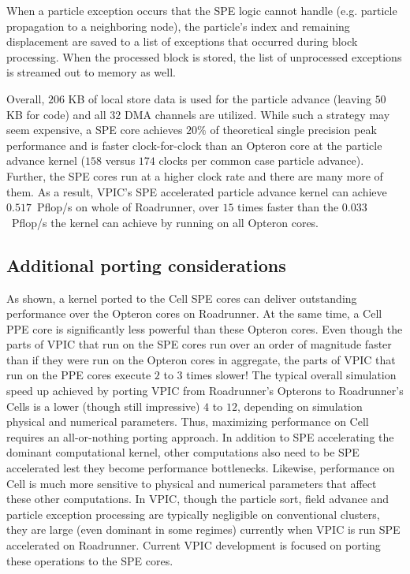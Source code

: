 \documentclass[letter,10pt]{article}
\begin{document}
When a particle exception occurs that the SPE logic cannot handle
(e.g. particle propagation to a neighboring node), the
particle's index and remaining displacement are saved to a list of
exceptions that occurred during block processing.  When the processed
block is stored, the list of unprocessed exceptions
is streamed out to memory as well.


Overall, $206$ KB of local store data is used for the particle advance
(leaving $50$ KB for code) and all $32$ DMA channels are utilized.
While such a strategy may seem expensive, a SPE core achieves $20\%$
of theoretical single precision peak performance and is faster
clock-for-clock than an Opteron core at the particle advance kernel
($158$ versus $174$ clocks per common case particle advance).  Further, 
the SPE cores run at a higher clock rate and there are many more of
them.  As a result, VPIC's SPE accelerated particle advance kernel can
achieve $0.517$~Pflop/s on whole of Roadrunner, over $15$ times faster
than the $0.033$~Pflop/s the kernel can achieve by running on all
Opteron cores.

\subsection{Additional porting considerations}

As shown, a kernel ported to the Cell SPE cores can deliver
outstanding performance over the Opteron cores on Roadrunner.  At the
same time, a Cell PPE core is significantly less powerful than these
Opteron cores.  Even though the parts of VPIC that run on the SPE
cores run over an order of magnitude faster than if they were run on
the Opteron cores in aggregate, the parts of VPIC that run on the PPE
cores execute $2$ to $3$ times slower!  The typical overall
simulation speed up achieved by porting VPIC from Roadrunner's
Opterons to Roadrunner's Cells is a lower (though still impressive)
$4$ to $12$, depending on simulation physical and numerical
parameters.  Thus, maximizing performance on Cell requires an
all-or-nothing porting approach.  In addition to SPE accelerating the
dominant computational kernel, other computations also need to be SPE
accelerated lest they become performance bottlenecks.  Likewise,
performance on Cell is much more sensitive to physical and numerical
parameters that affect these other computations.  In VPIC, though the
particle sort, field advance and particle exception processing are
typically negligible on conventional clusters, they are large (even
dominant in some regimes) currently when VPIC is run SPE accelerated
on Roadrunner.  Current VPIC development is focused on porting these
operations to the SPE cores.
\end{document}
